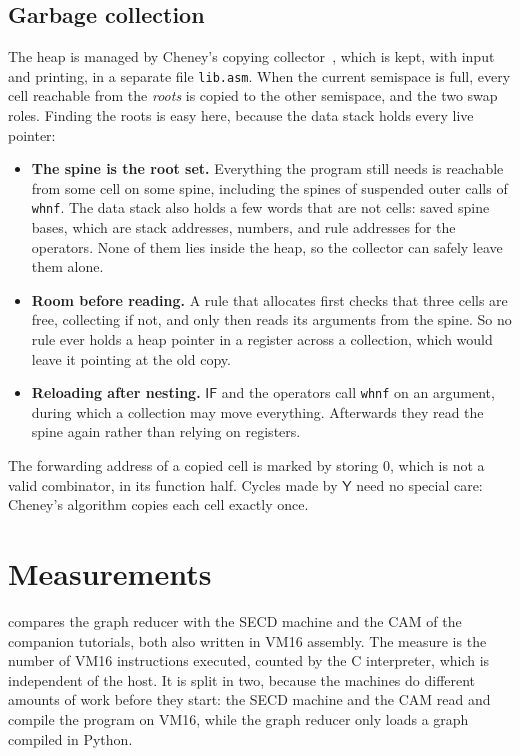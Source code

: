 \documentclass[11pt,a4paper]{article}
\newcommand{\cmb}[1]{\textsf{#1}}
\newcommand{\Y}{\cmb{Y}}
\newcommand{\IF}{\cmb{IF}}
\theoremstyle{definition}
\theoremstyle{plain}
\begin{document}
\subsection{Garbage collection}

The heap is managed by Cheney's copying collector~\cite{cheney70}, which is
kept, with input and printing, in a separate file \texttt{lib.asm}. When
the
current semispace is full, every cell reachable from the \emph{roots} is
copied to the other semispace, and the two swap roles. Finding the roots is
easy here, because the data stack holds every live pointer:

\begin{itemize}[itemsep=2pt]
\item \textbf{The spine is the root set.} Everything the program still needs
  is reachable from some cell on some spine, including the spines of
  suspended outer calls of \texttt{whnf}. The data stack also holds a few
  words that are not cells: saved spine bases, which are stack addresses,
  numbers, and rule addresses for the operators. None of them lies inside
  the heap, so the collector can safely leave them alone.
\item \textbf{Room before reading.} A rule that allocates first checks that
  three cells are free, collecting if not, and only then reads its arguments
  from the spine. So no rule ever holds a heap pointer in a register across a
  collection, which would leave it pointing at the old copy.
\item \textbf{Reloading after nesting.} $\IF$ and the operators call
  \texttt{whnf} on an argument, during which a collection may move
  everything. Afterwards they read the spine again rather than relying on
  registers.
\end{itemize}

\noindent
The forwarding address of a copied cell is marked by storing 0, which is not
a valid combinator, in its function half. Cycles made by $\Y$ need no special
care: Cheney's algorithm copies each cell exactly once.

\section{Measurements}\label{sec:measure}

 compares the graph reducer with the SECD machine and the
CAM of the companion tutorials, both also written in VM16 assembly. The
measure is the number of VM16 instructions executed, counted by the C
interpreter, which is independent of the host. It is split in two, because
the machines do different amounts of work before they start: the SECD
machine and the CAM read and compile the program on VM16, while the graph
reducer only loads a graph compiled in Python.
\end{document}

